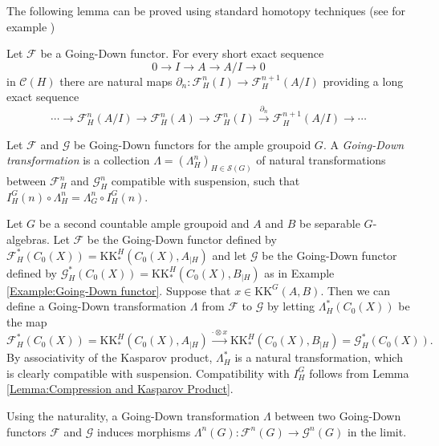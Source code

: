 	The following lemma can be proved using standard homotopy techniques (see for example \cite[§21.4]{MR1656031})
	\begin{lemma} Let $\mathcal{F}$ be a Going-Down functor.
		For every short exact sequence $$0\longrightarrow I\longrightarrow A\longrightarrow A/I\longrightarrow 0$$ in $\mathcal{C}(H)$ there are natural maps $\partial_n:\mathcal{F}_H^n(I)\rightarrow\mathcal{F}_H^{n+1}(A/I)$ providing a long exact sequence
		$$\cdots\longrightarrow \mathcal{F}_H^n(A/I)\longrightarrow \mathcal{F}_H^{n}(A)\longrightarrow\mathcal{F}_H^n(I)\stackrel{\partial_n}{\longrightarrow}\mathcal{F}_H^{n+1}(A/I)\longrightarrow\cdots$$
	\end{lemma}
	\begin{defi}
		Let $\mathcal{F}$ and $\mathcal{G}$ be Going-Down functors for the ample groupoid $G$. A \textit{Going-Down transformation} is a collection $\Lambda=(\Lambda_H^n)_{H\in \mathcal{S}(G)}$ of natural transformations between $\mathcal{F}_H^n$ and $\mathcal{G}_H^n$ compatible with suspension, such that
		$I_H^G(n)\circ \Lambda_H^n=\Lambda_G^n\circ I_H^G(n)$.
	\end{defi}
	\begin{ex}
		Let $G$ be a second countable ample groupoid and $A$ and $B$ be separable $G$-algebras. Let $\mathcal{F}$ be the Going-Down functor defined by $\mathcal{F}_H^*(C_0(X))=\mathrm{KK}^H_*(C_0(X),A_{\mid H})$ and let $\mathcal{G}$ be the Going-Down functor defined by $\mathcal{G}_H^*(C_0(X))=\mathrm{KK}^H_*(C_0(X),B_{\mid H})$ as in Example \ref{Example:Going-Down functor}. Suppose that $x\in \mathrm{KK}^G(A,B)$. Then we can define a Going-Down transformation
		$\Lambda$ from $\mathcal{F}$ to $\mathcal{G}$ by letting $\Lambda_H^*(C_0(X))$ be the map $$\mathcal{F}_H^*(C_0(X))=\mathrm{KK}^H_*(C_0(X),A_{\mid H})\stackrel{\cdot \otimes x}{\rightarrow} \mathrm{KK}^H_*(C_0(X),B_{\mid H})=\mathcal{G}_H^*(C_0(X)).$$
		By associativity of the Kasparov product, $\Lambda_H^*$ is a natural transformation, which is clearly compatible with suspension. Compatibility with $I_H^G$ follows from Lemma \ref{Lemma:Compression and Kasparov Product}.	
	\end{ex}
	Using the naturality, a Going-Down transformation $\Lambda$ between two Going-Down functors $\mathcal{F}$ and $\mathcal{G}$ induces morphisms $\Lambda^n(G):\mathcal{F}^n(G)\rightarrow\mathcal{G}^n(G)$ in the limit.
	

